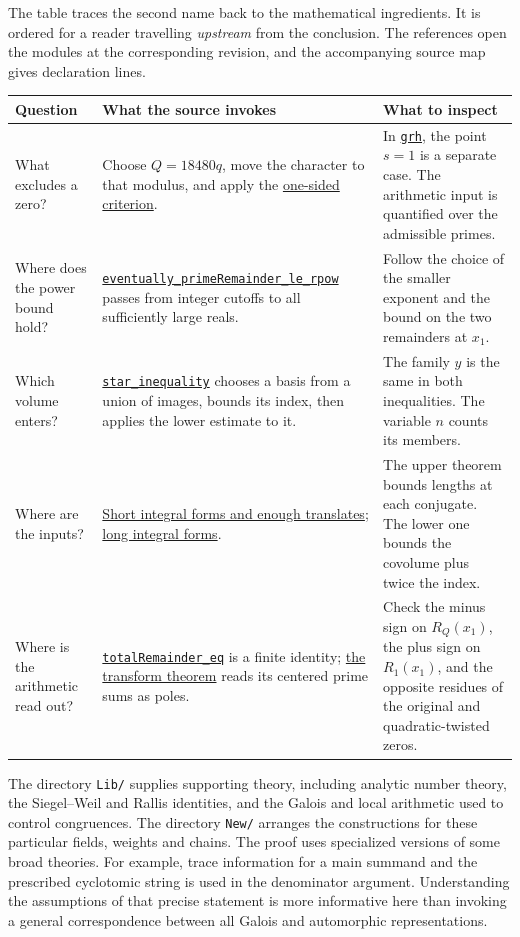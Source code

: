 \documentclass[11pt,letterpaper]{article}
\newcommand{\sref}[2]{\href{https://github.com/VladimirReshetnikov/ProveIt/blob/d8415e76ad850651f8c0083afe689dd9f4a45a10/Analysis/GeneralizedRiemannHypothesis/vendor/grh-lean/grh/src/#1.lean}{#2}}
\begin{document}
The table traces the second name back to the mathematical ingredients. It is ordered for a reader travelling \emph{upstream} from the conclusion. The references open the modules at the corresponding revision, and the accompanying source map gives declaration lines.
\begin{center}
{\small\renewcommand{\arraystretch}{1.19}
\begin{tabularx}{\linewidth}{@{}>{\raggedright\arraybackslash}p{.22\linewidth} >{\raggedright\arraybackslash}X >{\raggedright\arraybackslash}X@{}}
\toprule
\textbf{Question} & \textbf{What the source invokes} & \textbf{What to inspect}\\ \midrule
What excludes a zero? &
Choose \(Q=18480q\), move the character to that modulus, and apply the \sref{New/Reduction/Zeros/Criterion}{one-sided criterion}. &
In \sref{New/Reduction/OneSidedBound}{\texttt{grh}}, the point \(s=1\) is a separate case. The arithmetic input is quantified over the admissible primes.\\
Where does the power bound hold? &
\sref{New/Reduction/OneSidedBound}{\texttt{eventually\_\allowbreak primeRemainder\_\allowbreak le\_rpow}} passes from integer cutoffs to all sufficiently large reals. &
Follow the choice of the smaller exponent and the bound on the two remainders at \(x_1\).\\
Which volume enters? &
\sref{New/Reduction/MainInequality}{\texttt{star\_inequality}} chooses a basis from a union of images, bounds its index, then applies the lower estimate to it. &
The family \(y\) is the same in both inequalities. The variable \(n\) counts its members.\\
Where are the inputs? &
\sref{New/Reduction/ShortAndEnough}{Short integral forms and enough translates}; \sref{New/Determinant/Twist/LongForms}{long integral forms}. &
The upper theorem bounds lengths at each conjugate. The lower one bounds the covolume plus twice the index.\\
Where is the arithmetic read out? &
\sref{New/Reduction/PrimeSums}{\texttt{totalRemainder\_eq}} is a finite identity; \sref{New/Reduction/Zeros/PrimeError}{the transform theorem} reads its centered prime sums as poles. &
Check the minus sign on \(R_Q(x_1)\), the plus sign on \(R_1(x_1)\), and the opposite residues of the original and quadratic-twisted zeros.\\
\bottomrule
\end{tabularx}}
\end{center}

The directory \texttt{Lib/} supplies supporting theory, including analytic number theory, the Siegel--Weil and Rallis identities, and the Galois and local arithmetic used to control congruences. The directory \texttt{New/} arranges the constructions for these particular fields, weights and chains. The proof uses specialized versions of some broad theories. For example, trace information for a main summand and the prescribed cyclotomic string is used in the denominator argument. Understanding the assumptions of that precise statement is more informative here than invoking a general correspondence between all Galois and automorphic representations.
\end{document}
